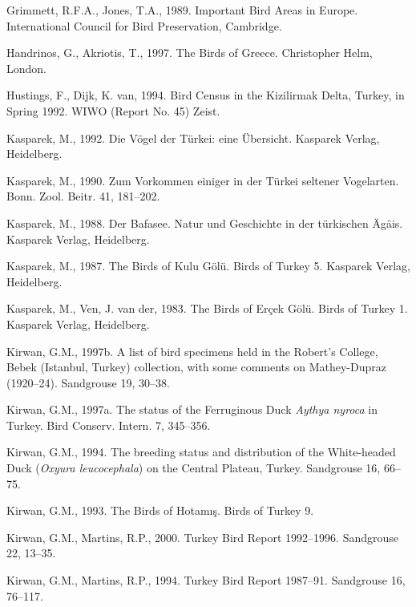 \documentclass[
  a4paper,
  DIV=11,
  numbers=noendperiod]{scrartcl}
\newlength{\cslhangindent}
\newenvironment{CSLReferences}[2] %
 {\begin{list}{}{%
  \setlength{\itemindent}{0pt}
  \setlength{\leftmargin}{0pt}
  \setlength{\parsep}{0pt}
  \ifodd #1
   \setlength{\leftmargin}{\cslhangindent}
   \setlength{\itemindent}{-1\cslhangindent}
  \fi
  \setlength{\itemsep}{#2\baselineskip}}}
 {\end{list}}
\begin{document}
\begin{CSLReferences}{1}{0}
Grimmett, R.F.A., Jones, T.A., 1989. {Important Bird Areas in Europe}.
International Council for Bird Preservation, Cambridge.

Handrinos, G., Akriotis, T., 1997. {The Birds of Greece}. Christopher
Helm, London.

Hustings, F., Dijk, K. van, 1994. {Bird Census in the Kizilirmak Delta,
Turkey, in Spring 1992}. WIWO (Report No. 45) Zeist.

Kasparek, M., 1992. {Die Vögel der Türkei: eine Übersicht}. Kasparek
Verlag, Heidelberg.

Kasparek, M., 1990. {Zum Vorkommen einiger in der Türkei seltener
Vogelarten}. Bonn. Zool. Beitr. 41, 181--202.

Kasparek, M., 1988. {Der Bafasee. Natur und Geschichte in der türkischen
Ägäis}. Kasparek Verlag, Heidelberg.

Kasparek, M., 1987. {The Birds of Kulu Gölü. Birds of Turkey 5}.
Kasparek Verlag, Heidelberg.

Kasparek, M., Ven, J. van der, 1983. {The Birds of Erçek Gölü. Birds of
Turkey 1}. Kasparek Verlag, Heidelberg.

Kirwan, G.M., 1997b. {A list of bird specimens held in the Robert's
College, Bebek (Istanbul, Turkey) collection, with some comments on
Mathey-Dupraz (1920--24)}. Sandgrouse 19, 30--38.

Kirwan, G.M., 1997a. {The status of the Ferruginous Duck \emph{Aythya
nyroca} in Turkey}. Bird Conserv. Intern. 7, 345--356.

Kirwan, G.M., 1994. {The breeding status and distribution of the
White-headed Duck (\emph{Oxyura leucocephala}) on the Central Plateau,
Turkey}. Sandgrouse 16, 66--75.

Kirwan, G.M., 1993. {The Birds of Hotamış}. Birds of Turkey 9.

Kirwan, G.M., Martins, R.P., 2000. {Turkey Bird Report 1992--1996}.
Sandgrouse 22, 13--35.

Kirwan, G.M., Martins, R.P., 1994. {Turkey Bird Report 1987--91}.
Sandgrouse 16, 76--117.


\end{CSLReferences}
\end{document}
